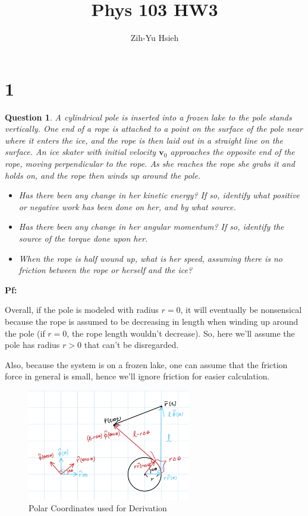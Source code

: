 \documentclass{article}
\title{Phys 103 HW3}
\author{Zih-Yu Hsieh}
\newtheorem{question}{Question}
\newcommand{\bv}{\textbf{v}} %
\begin{document}
\maketitle

\section*{1}
\begin{question}\label{q1}
    A cylindrical pole is inserted into a frozen lake to the pole stands vertically. One end of a rope is attached to a point on the surface of the pole near where it enters the ice, and the rope is then laid out in a straight line on the surface. An ice skater with initial velocity $\bv_0$ approaches the opposite end of the rope, moving perpendicular to the rope. As she reaches the rope she grabs it and holds on, and the rope then winds up around the pole.
    \begin{itemize}
        \item[(a)] Has there been any change in her kinetic energy? If so, identify what positive or negative work has been done on her, and by what source.
        \item[(b)] Has there been any change in her angular momentum? If so, identify the source of the torque done upon her.
        \item[(c)] When the rope is half wound up, what is her speed, assuming there is no friction between the rope or herself and the ice?
    \end{itemize}
\end{question}

\textbf{Pf:}

Overall, if the pole is modeled with radius $r=0$, it will eventually be nonsensical because the rope is assumed to be decreasing in length when winding up around the pole (if $r=0$, the rope length wouldn't decrease). So, here we'll assume the pole has radius $r>0$ that can't be disregarded.

Also, because the system is on a frozen lake, one can assume that the friction force in general is small, hence we'll ignore friction for easier calculation.

\begin{figure}[h!]
    \begin{center}
        \includegraphics[width=71.5mm]{phys103_q1a.jpg}
        \caption{Polar Coordinates used for Derivation}
    \end{center}
\end{figure}
\end{document}
